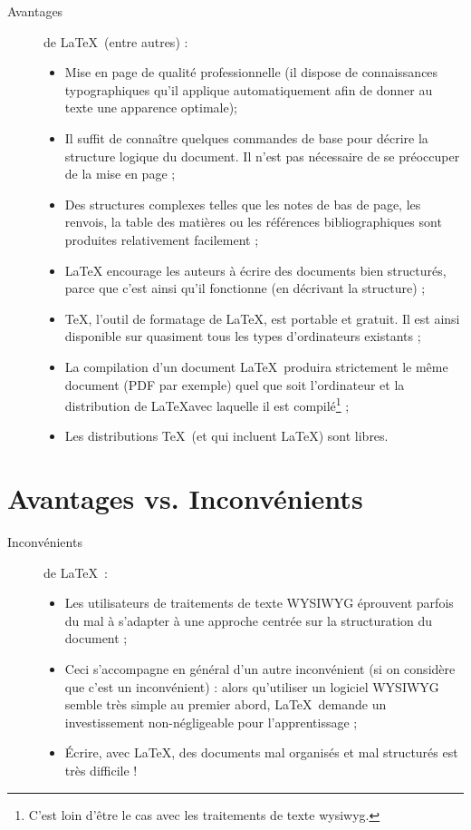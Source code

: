 \begin{description}
\item[Avantages] de \LaTeX\ (entre autres) :
  \begin{itemize}
  \item Mise en page de qualité professionnelle (il dispose de \og
    connaissances \fg typographiques qu'il applique automatiquement
    afin de donner au texte une apparence optimale);
  \item Il suffit de connaître quelques commandes de base pour décrire
    la structure logique du document. Il n'est pas nécessaire de se
    préoccuper de la mise en page ;
  \item Des structures complexes telles que les notes de bas de page,
    les renvois, la table des matières ou les références
    bibliographiques sont produites relativement facilement ;
  \item \LaTeX{} encourage les auteurs à écrire des documents bien
    structurés, parce que c'est ainsi qu'il fonctionne (en décrivant
    la structure) ;
  \item \TeX{}, l'outil de formatage de \LaTeX{}, est portable et
    gratuit. Il est ainsi disponible sur quasiment tous les types
    d'ordinateurs existants ;
  \item La compilation d'un document \LaTeX\ produira strictement le
    même document (PDF par exemple) quel que soit l'ordinateur et la
    distribution de \LaTeX avec laquelle il est compilé\footnote{C'est
      loin d'être le cas avec les traitements de texte wysiwyg.} ;
  \item Les distributions \TeX\ (et qui incluent \LaTeX) sont
    libres.
  \end{itemize}
\end{description}


\section*{Avantages vs. Inconvénients}

\begin{description}
\item[Inconvénients] de \LaTeX\ :
  \begin{itemize}
  \item Les utilisateurs de traitements de texte WYSIWYG éprouvent
    parfois du mal à s'adapter à une approche centrée sur la
    structuration du document ;
  \item Ceci s'accompagne en général d'un autre inconvénient (si on
    considère que c'est un inconvénient) : alors qu'utiliser un
    logiciel WYSIWYG semble très simple au premier abord, \LaTeX\
    demande un investissement non-négligeable pour l'apprentissage ;
  \item \'Ecrire, avec \LaTeX{}, des documents mal organisés et mal
    structurés est très difficile !
  \end{itemize}
\end{description}



